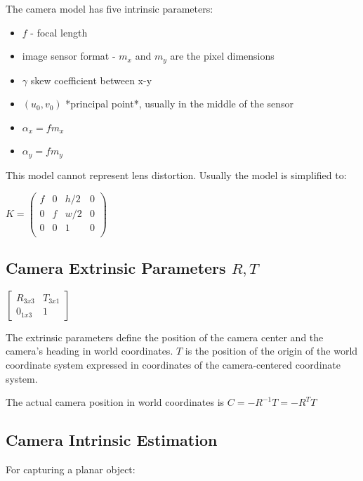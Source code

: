 The camera model has five intrinsic parameters:
\begin{itemize}
\item $f$ - focal length
\item  image sensor format - $m_x$ and $m_y$ are the pixel dimensions
\item  $\gamma$ skew coefficient between x-y
\item  $(u_0,v_0)$ *principal point*, usually in the middle of the sensor
\item  $\alpha_x = f m_x $
\item  $\alpha_y = f m_y $
\end{itemize}

This model cannot represent lens distortion. Usually the model is simplified to:

$ K = \left( \begin{matrix} 
f & 0 & h/2 & 0 \\
0 & f  & w/2 & 0 \\
0 & 0 &  1 & 0 \\
\end{matrix}
\right) $

\subsection{Camera Extrinsic Parameters $R,T$}

$ \left[ 
\begin{matrix} 
R_{3x3} & T_{3x1} \\
0_{1x3} & 1 
\end{matrix}
\right] $

The extrinsic parameters define the position of the camera center and the camera's heading in world coordinates. $T$ is the position of the origin of the world coordinate system expressed in coordinates of the camera-centered coordinate system. 

The actual camera position in world coordinates is $C = -R^{-1}T=-R^{T}T $

\subsection{Camera Intrinsic Estimation}

For capturing a planar object:

